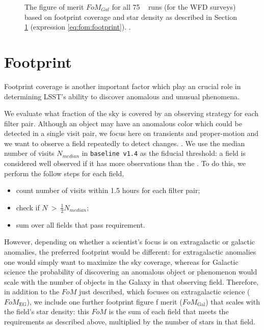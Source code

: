\begin{figure}
\centering
{}
\caption{The figure of merit $FoM_{Gal}$ for all 75 \opsim~ runs (for the WFD surveys) based on footprint coverage and star density as described in Section \ref{sec:fom:footprint } (expression \ref{eq:fom:footprint}). . }
\label{fig:starDensity_FOM}
\end{figure}



\section{Footprint}\label{sec:fom:footprint }
Footprint coverage is another important factor which play an crucial role in determining LSST's ability to discover anomalous and unusual phenomena.

We evaluate what fraction of the sky is covered by an observing strategy for each filter pair. Although an object may have an anomalous color which could be detected in a single visit pair, we focus here on transients and proper-motion and we want to observe a field repeatedly to detect changes. . We use the median number of visits $N_{median}$ in \texttt{baseline v1.4} as the fiducial threshold: a field is considered well observed if it has more observations than the .  
To do this, we perform the follow steps for each field, 

\begin{itemize}
    \item count number of visits within 1.5 hours for each filter pair; 
    \item check if $N ~>~\frac{1}{2}N_{median}$;
    \item sum over all fields that pass requirement.
\end{itemize}

However, depending on whether a scientist's focus is on extragalactic or  galactic anomalies, the preferred footprint would be different: for extragalactic anomalies one would simply want to maximize the sky coverage, whereas for Galactic science the probability of discovering an anomalous object or phenomenon would scale with the number of objects in the Galaxy in that observing field. Therefore, in addition to the $FoM$ just described, which focuses on extragalactic science ($FoM_\mathrm{EG}$), we include one further footprint figure f merit ($FoM_\mathrm{Gal}$) that scales with the field's star density: this $FoM$ is the sum of each field that meets the requirements as described above, multiplied by the number of stars in that field.

